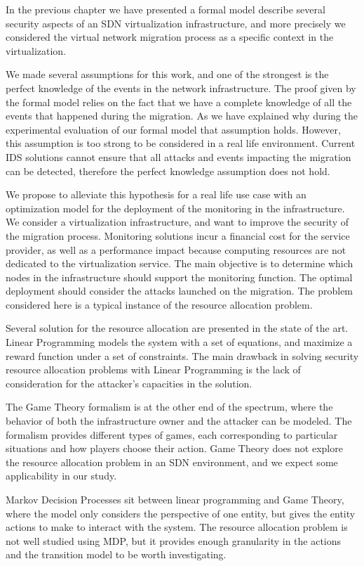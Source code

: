 In the previous chapter we have presented a formal model describe several security aspects of an SDN virtualization infrastructure, and more precisely we considered the virtual network migration process as a specific context in the virtualization.

We made several assumptions for this work, and one of the strongest is the perfect knowledge of the events in the network infrastructure. The proof given by the formal model relies on the fact that we have a complete knowledge of all the events that happened during the migration. As we have explained why during the experimental evaluation of our formal model that assumption holds. However, this assumption is too strong to be considered in a real life environment. Current IDS solutions cannot ensure that all attacks and events impacting the migration can be detected, therefore the perfect knowledge assumption does not hold.

We propose to alleviate this hypothesis for a real life use case with an optimization model for the deployment of the monitoring in the infrastructure.
We consider a virtualization infrastructure, and want to improve the security of the migration process.
Monitoring solutions incur a financial cost for the service provider, as well as a performance impact because computing resources are not dedicated to the virtualization service.
The main objective is to determine which nodes in the infrastructure should support the monitoring function.
The optimal deployment should consider the attacks launched on the migration.
The problem considered here is a typical instance of the resource allocation problem.

Several solution for the resource allocation are presented in the state of the art. 
Linear Programming models the system with a set of equations, and maximize a reward function under a set of constraints.
The main drawback in solving security resource allocation problems with Linear Programming is the lack of consideration for the attacker's capacities in the solution.

The Game Theory formalism is at the other end of the spectrum, where the behavior of both the infrastructure owner and the attacker can be modeled.
The formalism provides different types of games, each corresponding to particular situations and how players choose their action.
Game Theory does not explore the resource allocation problem in an SDN environment, and we expect some applicability in our study.

Markov Decision Processes sit between linear programming and Game Theory, where the model only considers the perspective of one entity, but gives the entity actions to make to interact with the system. The resource allocation problem is not well studied using MDP, but it provides enough granularity in the actions and the transition model to be worth investigating.



